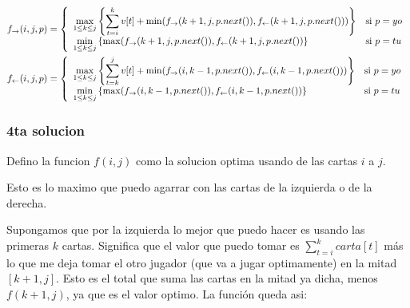 \begin{align*}\hspace*{-2cm}
 f_{\rightarrow}(i,j,p) &= 
 \left\{
    \begin{array}{ll}
	\displaystyle \max_{1\leq k\leq j} \left\{ \sum_{t=i}^k v[t] + \min( f_{\rightarrow}(k+1, j, p.next()), f_{\leftarrow}(k+1,j,p.next() ))  \right\}& \mbox{si } p = yo \\
	\displaystyle \min_{1\leq k\leq j} \left\{ \max( f_{\rightarrow}(k+1, j, p.next()), f_{\leftarrow}(k+1,j,p.next() ) \right\} & \mbox{si } p = tu
    \end{array}
\right. \\
 f_{\leftarrow}(i,j,p) &= 
 \left\{
    \begin{array}{ll}
	\displaystyle \max_{1\leq k\leq j} \left\{ \sum_{t=k}^j v[t] + \min( f_{\rightarrow}(i, k-1, p.next()), f_{\leftarrow}(i, k-1,p.next() ))  \right\}& \mbox{si } p = yo \\
	\displaystyle \min_{1\leq k\leq j} \left\{ \max( f_{\rightarrow}(i, k-1, p.next()), f_{\leftarrow}(i, k-1,p.next() ) \right\} & \mbox{si } p = tu
    \end{array}
\right. \\
\end{align*}

\newpage
\subsubsection{4ta solucion}

Defino la funcion $f(i,j)$ como la solucion optima usando de las cartas $i$ a $j$. 

Esto es lo maximo que puedo agarrar con las cartas de la izquierda o de la derecha. 

Supongamos que por la izquierda lo mejor que puedo hacer es usando las primeras $k$ cartas. Significa que el valor que puedo tomar es $\sum_{t=i}^{k} carta[t]$ m\'as lo que me deja tomar el otro jugador (que va a jugar optimamente) en la mitad $[k+1, j]$. Esto es el total que suma las cartas en la mitad ya dicha, menos $f(k+1, j)$, ya que es el valor optimo. La funci\'on queda asi: 


